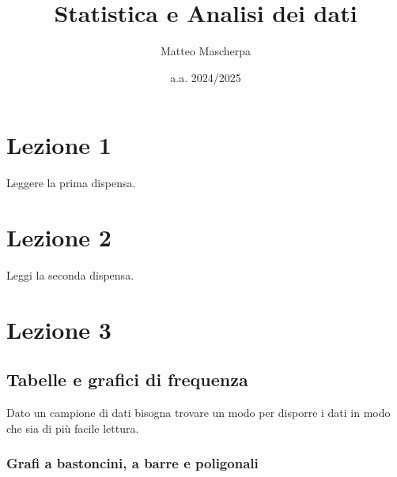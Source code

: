 \documentclass{article}
\title{Statistica e Analisi dei dati}
\author{Matteo Mascherpa}
\date{a.a. 2024/2025}
\begin{document}
\maketitle

\tableofcontents

\section*{Lezione 1}

Leggere la prima dispensa.

\section*{Lezione 2}

Leggi la seconda dispensa.

\section*{Lezione 3}

\subsection*{Tabelle e grafici di frequenza}

Dato un campione di dati bisogna trovare un modo per disporre i dati in modo che sia di più facile lettura.

\subsubsection*{Grafi a bastoncini, a barre e poligonali}
\end{document}
